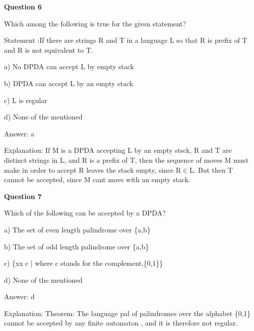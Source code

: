 \documentclass{article}
\begin{document}
\begin{mdframed}[linewidth=1pt, roundcorner=5pt, linecolor=gray!30, backgroundcolor=gray!5]
\textbf{Question 6} 

Which among the following is true for the given statement?

Statement :If there are strings R and T in a language L so that R is prefix of T and R is not equivalent to T.

a) No DPDA can accept L by empty stack

b) DPDA can accept L by an empty stack

c) L is regular

d) None of the mentioned
\vspace{5pt} \par
\begin{tcolorbox}[colback=green!5, colframe=green!40!black, title=Solution]
Answer: a

Explanation: If M is a DPDA accepting L by an empty stsck, R and T are distinct strings in L, and R is a prefix of T, then the sequence of moves M must make in order to accept R leaves the stack empty, since R$\in$L. But then T cannot be accepted, since M cant move with an empty stack.
\end{tcolorbox}
\end{mdframed}
\newpage

\begin{mdframed}[linewidth=1pt, roundcorner=5pt, linecolor=gray!30, backgroundcolor=gray!5]
\textbf{Question 7} 

Which of the following can be accepted by a DPDA?

a) The set of even length palindrome over \{a,b\}

b) The set of odd length palindrome over \{a,b\}

c) \{xx
c
| where c stands for the complement,\{0,1\}\}

d) None of the mentioned
\vspace{5pt} \par
\begin{tcolorbox}[colback=green!5, colframe=green!40!black, title=Solution]
Answer: d

Explanation: Theorem: The language pal of palindromes over the alphabet \{0,1\} cannot be accepted by any finite automaton , and it is therefore not regular.
\end{tcolorbox}
\end{mdframed}
\end{document}
